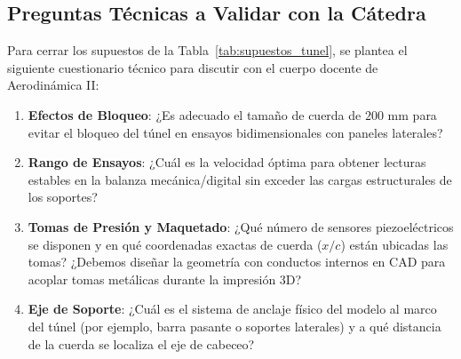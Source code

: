 \subsection{Preguntas Técnicas a Validar con la Cátedra}
Para cerrar los supuestos de la Tabla~\ref{tab:supuestos_tunel}, se plantea el siguiente cuestionario técnico para discutir con el cuerpo docente de Aerodinámica II:
\begin{enumerate}
    \item \textbf{Efectos de Bloqueo}: ¿Es adecuado el tamaño de cuerda de $200\text{ mm}$ para evitar el bloqueo del túnel en ensayos bidimensionales con paneles laterales?
    \item \textbf{Rango de Ensayos}: ¿Cuál es la velocidad óptima para obtener lecturas estables en la balanza mecánica/digital sin exceder las cargas estructurales de los soportes?
    \item \textbf{Tomas de Presión y Maquetado}: ¿Qué número de sensores piezoeléctricos se disponen y en qué coordenadas exactas de cuerda ($x/c$) están ubicadas las tomas? ¿Debemos diseñar la geometría con conductos internos en CAD para acoplar tomas metálicas durante la impresión 3D?
    \item \textbf{Eje de Soporte}: ¿Cuál es el sistema de anclaje físico del modelo al marco del túnel (por ejemplo, barra pasante o soportes laterales) y a qué distancia de la cuerda se localiza el eje de cabeceo?
\end{enumerate}
